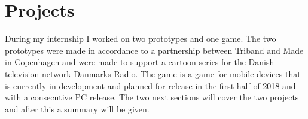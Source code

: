 \section{Projects}
During my internship I worked on two prototypes and one game. The two prototypes were made in accordance to a partnership between Triband and Made in Copenhagen and were made to support a cartoon series for the Danish television network Danmarks Radio. The game is a game for mobile devices that is currently in development and planned for release in the first half of 2018 and with a consecutive PC release. The two next sections will cover the two projects and after this a summary will be given.
